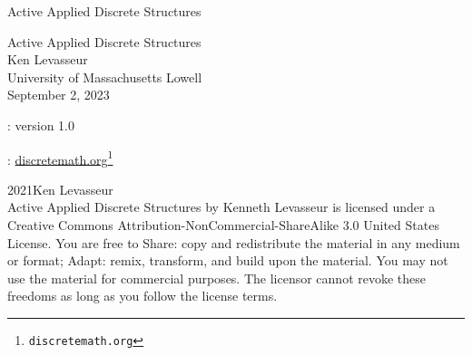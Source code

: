 \documentclass[oneside,10pt,]{book}
\newcommand{\titlepagefont}{\relax}
\numberwithin{equation}{section}
\begin{document}
\raggedbottom
\frontmatter
\thispagestyle{empty}
{\titlepagefont\centering
\vspace*{0.28\textheight}
{\Huge Active Applied Discrete Structures}\\}
\clearpage
\thispagestyle{empty}
{\titlepagefont\centering
\vspace*{0.14\textheight}
{\Huge Active Applied Discrete Structures}\\[3\baselineskip]
{\Large Ken Levasseur}\\[0.5\baselineskip]
{\Large University of Massachusetts Lowell}\\[3\baselineskip]
{\Large September 2, 2023}\\}
\clearpage
\thispagestyle{empty}
\hypertarget{colophon-index-active-ads-b}{}
: version 1.0\par\medskip
{}: \href{http://discretemath.org}{discretemath.org}\footnote{\nolinkurl{discretemath.org}\label{fn-index-active-ads-b-b-b}}\par\medskip
\noindent\textcopyright{}2021\quad{}Ken Levasseur\\[0.5\baselineskip]
Active Applied Discrete Structures by Kenneth Levasseur is licensed under a Creative Commons Attribution-NonCommercial-ShareAlike 3.0 United States License. You are free to Share: copy and redistribute the material in any medium or format; Adapt: remix, transform, and build upon the material. You may not use the material for commercial purposes.  The licensor cannot revoke these freedoms as long as you follow the license terms.\par\medskip
{}
\null\clearpage
%
%
\typeout{************************************************}
\typeout{************************************************}
%
\end{document}
